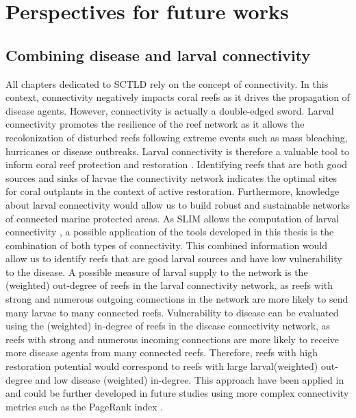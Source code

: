 \section{Perspectives for future works}

\subsection*{Combining disease and larval connectivity}
All chapters dedicated to SCTLD rely on the concept of connectivity. In this context, connectivity negatively impacts coral reefs as it drives the propagation of disease agents. However, connectivity is actually a double-edged sword. Larval connectivity promotes the resilience of the reef network as it allows the recolonization of disturbed reefs following extreme events such as mass bleaching, hurricanes or disease outbreaks. Larval connectivity is therefore a valuable tool to inform coral reef protection and restoration \citep{botsford2009connectivity,mumby2011reserve}. Identifying reefs that are both good sources and sinks of larvae the connectivity network indicates the optimal sites for coral outplants in the context of active restoration. Furthermore, knowledge about larval connectivity would allow us to build robust and sustainable networks of connected marine protected areas. As SLIM allows the computation of larval connectivity \citep{thomas2014numerical,frys2020fine}, a possible application of the tools developed in this thesis is the combination of both types of connectivity.  This combined information would allow us to identify reefs that are good larval sources and have low vulnerability to the disease. A possible measure of larval supply to the network is the (weighted) out-degree of reefs in the larval connectivity network, as reefs with strong and numerous outgoing connections in the network are more likely to send many larvae to many connected reefs. Vulnerability to disease can be evaluated using the (weighted) in-degree of reefs in the disease connectivity network, as reefs with strong and numerous incoming connections are more likely to receive more disease agents from many connected reefs. Therefore, reefs with high restoration potential would correspond to reefs with large larval(weighted) out-degree and low disease (weighted) in-degree. This approach have been applied in \cite{holstein2022} and could be further developed in future studies using more complex connectivity metrics such as the PageRank index \citep{frys2020fine}. 

